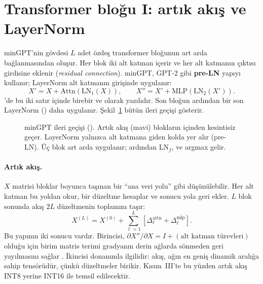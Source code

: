 \section{Transformer bloğu I: artık akış ve LayerNorm}

minGPT'nin gövdesi $L$ adet özdeş transformer bloğunun art arda bağlanmasından oluşur. Her blok iki alt katman içerir ve her alt katmanın çıktısı girdisine eklenir (\emph{residual connection}). minGPT, GPT-2 gibi \textbf{pre-LN} yapıyı kullanır; LayerNorm alt katmanın girişinde uygulanır:
\begin{equation}
  X' = X + \mathrm{Attn}\left(\mathrm{LN}_1(X)\right), \qquad
  X'' = X' + \mathrm{MLP}\left(\mathrm{LN}_2(X')\right).
\end{equation}
'de bu iki satır  içinde birebir  ve  olarak yazılıdır. Son bloğun ardından bir son LayerNorm () daha uygulanır. Şekil~\ref{fig:gpt} bütün ileri geçişi gösterir.

\begin{figure}[t]
  \centering
  \caption[minGPT ileri geçişi]{minGPT ileri geçişi (). Artık akış (mavi) blokların içinden kesintisiz geçer. LayerNorm yalnızca alt katmana giden kolda yer alır (pre-LN). Üç blok art arda uygulanır; ardından LN$_f$,  ve argmax gelir.}
  \label{fig:gpt}
\end{figure}

\paragraph{Artık akış.} $X$ matrisi bloklar boyunca taşınan bir ``ana veri yolu'' gibi düşünülebilir. Her alt katman bu yoldan okur, bir düzeltme hesaplar ve sonucu yola geri ekler. $L$ blok sonunda akış $2L$ düzeltmenin toplamını taşır:
\begin{equation}
  X^{(L)} = X^{(0)} + \sum_{\ell=1}^{L} \left[ \Delta^{\mathrm{attn}}_{\ell} + \Delta^{\mathrm{mlp}}_{\ell} \right].
\end{equation}
Bu yapının iki sonucu vardır. Birincisi, $\partial X''/\partial X = I + (\text{alt katman türevleri})$ olduğu için birim matris terimi gradyanın derin ağlarda sönmeden geri yayılmasını sağlar \cite{he16}. İkincisi donanımla ilgilidir: akış, ağın en geniş dinamik aralığa sahip tensörüdür, çünkü düzeltmeler birikir. Kısım~III'te bu yüzden artık akış INT8 yerine INT16 ile temsil edilecektir.


